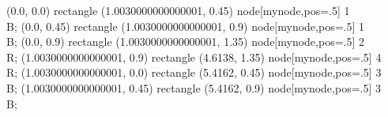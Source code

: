  (0.0, 0.0) rectangle (1.0030000000000001, 0.45) node[mynode,pos=.5] {1 \\ B};
 (0.0, 0.45) rectangle (1.0030000000000001, 0.9) node[mynode,pos=.5] {1 \\ B};
 (0.0, 0.9) rectangle (1.0030000000000001, 1.35) node[mynode,pos=.5] {2 \\ R};
 (1.0030000000000001, 0.9) rectangle (4.6138, 1.35) node[mynode,pos=.5] {4 \\ R};
 (1.0030000000000001, 0.0) rectangle (5.4162, 0.45) node[mynode,pos=.5] {3 \\ B};
 (1.0030000000000001, 0.45) rectangle (5.4162, 0.9) node[mynode,pos=.5] {3 \\ B};